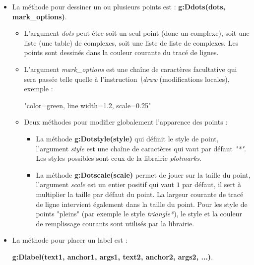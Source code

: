 \begin{itemize}
\item La méthode pour dessiner un ou plusieurs points est : \textbf{g:Ddots(dots, mark\_options)}.

    \begin{itemize}
    \item L'argument \emph{dots} peut être soit un seul point (donc un complexe), soit une liste (une table) de complexes, soit une liste  de liste de complexes. Les points sont dessinés dans la couleur courante du tracé de lignes.
    \item L'argument \emph{mark\_options} est une chaîne de caractères facultative qui sera passée telle quelle à l'instruction \emph{\textbackslash draw} (modifications locales), exemple :
\begin{TeXcode}
    "color=green, line width=1.2, scale=0.25"
\end{TeXcode}

    \item  Deux méthodes pour modifier globalement l'apparence des points :
        \begin{itemize}
        \item La méthode \textbf{g:Dotstyle(style)} qui définit le style de point, l'argument \emph{style} est une chaîne de caractères qui vaut par défaut \emph{"*"}. Les styles possibles sont ceux de la librairie \emph{plotmarks}.
        \item La méthode \textbf{g:Dotscale(scale)} permet de jouer sur la taille du point, l'argument \emph{scale} est un entier positif qui vaut $1$ par défaut, il sert à multiplier la taille par défaut du point. La largeur courante de tracé de ligne intervient également dans la taille du point. Pour les style de points "pleins" (par exemple le style \emph{triangle*}), le style et la couleur de remplissage courants sont utilisés par la librairie.
        \end{itemize}
    \end{itemize}
    
\item La méthode pour placer un label est : 

\hfil\textbf{g:Dlabel(text1, anchor1, args1, text2, anchor2, args2, ...)}.\hfil


\end{itemize}
